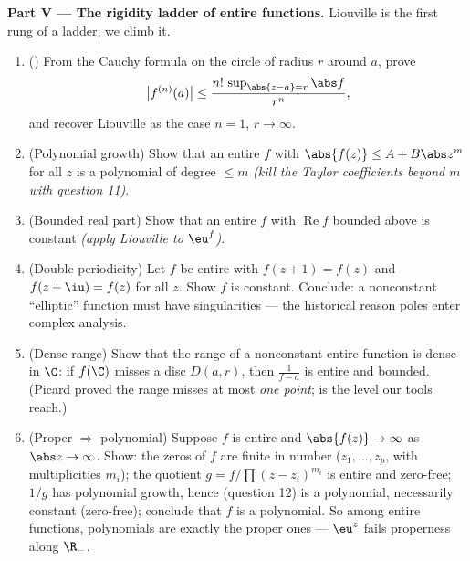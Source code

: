 \begin{problem}
\medskip
\noindent\textbf{Part V --- The rigidity ladder of entire
functions.} Liouville is the first rung of a ladder; we climb
it.
\begin{enumerate}[resume]
  \item () From the Cauchy formula on the
        circle of radius $r$ around $a$, prove
        \[
        \bigl|f^{(n)}(a)\bigr| \leq
        \frac{n!\,\sup_{\abs{z-a}=r}\abs f}{r^n} ,
        \]
        and recover Liouville as the case $n = 1$, $r \to
        \infty$.
  \item (Polynomial growth) Show that an entire $f$ with
        $\abs{f(z)} \leq A + B\abs z^m$ for all $z$ is a
        polynomial of degree $\leq m$ \emph{(kill the Taylor
        coefficients beyond $m$ with question 11)}.
  \item (Bounded real part) Show that an entire $f$ with
        $\operatorname{Re}f$ bounded above is constant
        \emph{(apply Liouville to $\eu^{f}$)}.
  \item (Double periodicity) Let $f$ be entire with $f(z + 1)
        = f(z)$ and $f(z + \iu) = f(z)$ for all $z$. Show $f$
        is constant. Conclude: a nonconstant ``elliptic''
        function must have singularities --- the historical
        reason poles enter complex analysis.
  \item (Dense range) Show that the range of a nonconstant
        entire function is dense in $\C$: if $f(\C)$ misses a
        disc $D(a, r)$, then $\frac1{f - a}$ is entire and
        bounded. (Picard proved the range misses at most
        \emph{one point};  is the level our tools
        reach.)
  \item (Proper $\Rightarrow$ polynomial) Suppose $f$ is
        entire and $\abs{f(z)} \to \infty$ as $\abs z \to
        \infty$. Show: the zeros of $f$ are finite in number
        ($z_1, \dots, z_p$, with multiplicities $m_i$); the
        quotient $g = f/\prod(z - z_i)^{m_i}$ is entire and
        zero-free; $1/g$ has polynomial growth, hence
        (question 12) is a polynomial, necessarily constant
        (zero-free); conclude that $f$ is a polynomial. So
        among entire functions, polynomials are exactly the
        proper ones --- $\eu^z$ fails properness along
        $\R_-$.
\end{enumerate}


\end{problem}
